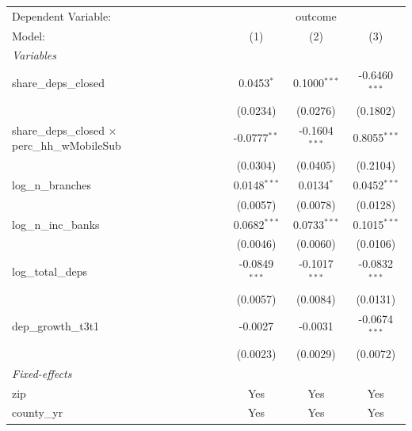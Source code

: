 \begingroup
\centering
\begin{tabular}{lccc}
   \tabularnewline \midrule \midrule
   Dependent Variable: & \multicolumn{3}{c}{outcome}\\
   Model:                                                 & (1)             & (2)             & (3)\\  
   \midrule
   \emph{Variables}\\
   share\_deps\_closed                                    & 0.0453$^{*}$    & 0.1000$^{***}$  & -0.6460$^{***}$\\   
                                                          & (0.0234)        & (0.0276)        & (0.1802)\\   
   share\_deps\_closed $\times$ perc\_hh\_wMobileSub      & -0.0777$^{**}$  & -0.1604$^{***}$ & 0.8055$^{***}$\\   
                                                          & (0.0304)        & (0.0405)        & (0.2104)\\   
   log\_n\_branches                                       & 0.0148$^{***}$  & 0.0134$^{*}$    & 0.0452$^{***}$\\   
                                                          & (0.0057)        & (0.0078)        & (0.0128)\\   
   log\_n\_inc\_banks                                     & 0.0682$^{***}$  & 0.0733$^{***}$  & 0.1015$^{***}$\\   
                                                          & (0.0046)        & (0.0060)        & (0.0106)\\   
   log\_total\_deps                                       & -0.0849$^{***}$ & -0.1017$^{***}$ & -0.0832$^{***}$\\   
                                                          & (0.0057)        & (0.0084)        & (0.0131)\\   
   dep\_growth\_t3t1                                      & -0.0027         & -0.0031         & -0.0674$^{***}$\\   
                                                          & (0.0023)        & (0.0029)        & (0.0072)\\   
   \midrule
   \emph{Fixed-effects}\\
   zip                                                    & Yes             & Yes             & Yes\\  
   county\_yr                                             & Yes             & Yes             & Yes\\  

\end{tabular}
